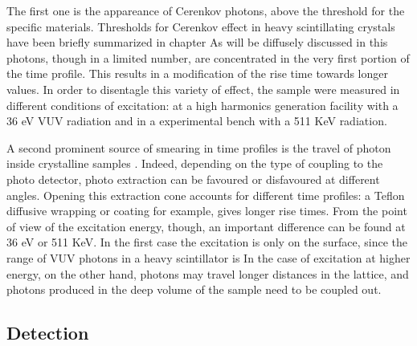 The first one is the appareance of Cerenkov photons, above the threshold for the specific materials. Thresholds for Cerenkov effect in heavy scintillating crystals have been briefly summarized in chapter %
As will be diffusely discussed in %
this photons, though in a limited number, are concentrated in the very first portion of the time profile. This results in a modification of the rise time towards longer values.
In order to disentagle this variety of effect, the sample were measured in different conditions of excitation: at a high harmonics generation facility with a 36 eV VUV radiation and in a experimental bench with a 511 KeV radiation.

A second prominent source of smearing in time profiles is the travel of photon inside crystalline samples \cite{Derenzo2000}. Indeed, depending on the type of coupling to the photo detector, photo extraction can be favoured or disfavoured at different angles. Opening this extraction cone accounts for different time profiles: a Teflon diffusive wrapping or coating for example, gives longer rise times. From the point of view of the excitation energy, though, an important difference can be found at 36 eV or 511 KeV. In the first case the excitation is only on the surface, since the range of VUV photons in a heavy scintillator is
In the case of excitation at higher energy, on the other hand, photons may travel longer distances in the lattice, and photons produced in the deep volume of the sample need to be coupled out.

\subsection{Detection}

